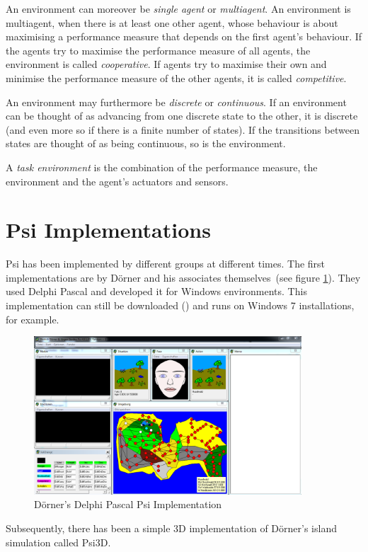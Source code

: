 An environment can moreover be \emph{single agent} or \emph{multiagent}. An environment is multiagent, when there is at least one other agent, whose behaviour is about maximising a performance measure that depends on the first agent's behaviour. If the agents try to maximise the performance measure of all agents, the environment is called \emph{cooperative}. If agents try to maximise their own and minimise the performance measure of the other agents, it is called \emph{competitive}.

An environment may furthermore be \emph{discrete} or \emph{continuous}. If an environment can be thought of as advancing from one discrete state to the other, it is discrete (and even more so if there is a finite number of states). If the transitions between states are thought of as being continuous, so is the environment.

A \emph{task environment} is the combination of the performance measure, the environment and the agent's actuators and sensors.

    \section{Psi Implementations}
Psi has been implemented by different groups at different times. The first implementations are by Dörner and his associates themselves~(see figure \ref{psi_screen}). They used Delphi Pascal and developed it for Windows environments. This implementation can still be downloaded (\cite{PsiDownload}) and runs on Windows 7 installations, for example. 

\begin{figure}[h]
  \centering
    \includegraphics[width=10cm]{graphics/psi_screen1}
  \caption{Dörner's Delphi Pascal Psi Implementation}
  \label{psi_screen}
\end{figure}

Subsequently, there has been a simple 3D implementation of Dörner's island simulation called Psi3D.


